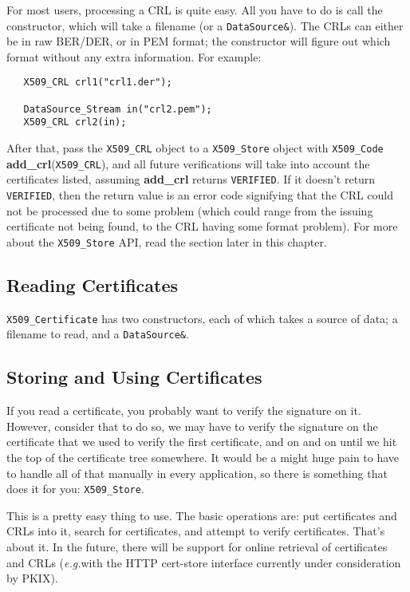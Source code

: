 \documentclass{article}
\newcommand{\function}[1]{\textbf{#1}}
\newcommand{\type}[1]{\texttt{#1}}
\newcommand{\eg}[0]{\emph{e.g.}}
\begin{document}
For most users, processing a CRL is quite easy. All you have to do is call the
constructor, which will take a filename (or a \type{DataSource\&}). The CRLs
can either be in raw BER/DER, or in PEM format; the constructor will figure out
which format without any extra information. For example:

\begin{verbatim}
   X509_CRL crl1("crl1.der");

   DataSource_Stream in("crl2.pem");
   X509_CRL crl2(in);
\end{verbatim}

After that, pass the \type{X509\_CRL} object to a \type{X509\_Store} object
with \type{X509\_Code} \function{add\_crl}(\type{X509\_CRL}), and all future
verifications will take into account the certificates listed, assuming
\function{add\_crl} returns \type{VERIFIED}. If it doesn't return
\type{VERIFIED}, then the return value is an error code signifying that the CRL
could not be processed due to some problem (which could range from the issuing
certificate not being found, to the CRL having some format problem). For more
about the \type{X509\_Store} API, read the section later in this chapter.

\subsection{Reading Certificates}

\type{X509\_Certificate} has two constructors, each of which takes a source of
data; a filename to read, and a \type{DataSource\&}.

\subsection{Storing and Using Certificates}

If you read a certificate, you probably want to verify the signature on
it. However, consider that to do so, we may have to verify the signature on the
certificate that we used to verify the first certificate, and on and on until
we hit the top of the certificate tree somewhere. It would be a might huge pain
to have to handle all of that manually in every application, so there is
something that does it for you: \type{X509\_Store}.

This is a pretty easy thing to use. The basic operations are: put certificates
and CRLs into it, search for certificates, and attempt to verify
certificates. That's about it. In the future, there will be support for online
retrieval of certificates and CRLs (\eg with the HTTP cert-store interface
currently under consideration by PKIX).
\end{document}
